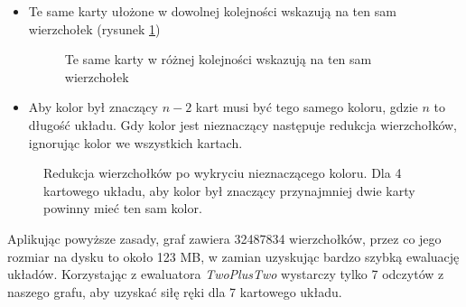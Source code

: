 \begin{itemize}
    \item Te same karty ułożone w dowolnej kolejności wskazują na ten sam wierzchołek (rysunek \ref{fig:graph-2})
    
    \begin{figure}[h]
    \centering
    \caption{Te same karty w różnej kolejności wskazują na ten sam wierzchołek}
    \label{fig:graph-2}   
    \end{figure}
    
    \item Aby kolor był znaczący $n-2$ kart musi być tego samego koloru, gdzie $n$ to długość układu. Gdy kolor jest nieznaczący następuje redukcja wierzchołków, ignorując kolor we wszystkich kartach.
\end{itemize}

\begin{figure}[h]
\centering
{}
\caption{Redukcja wierzchołków po wykryciu nieznaczącego koloru. Dla 4 kartowego układu, aby kolor był znaczący przynajmniej dwie karty powinny mieć ten sam kolor.}
\label{fig:graph-3}
\end{figure}

Aplikując powyższe zasady, graf zawiera 32487834 wierzchołków, przez co jego rozmiar na dysku to około 123 MB, w zamian uzyskując bardzo szybką ewaluację układów.
Korzystając z ewaluatora \emph{TwoPlusTwo} wystarczy tylko 7 odczytów z naszego grafu, aby uzyskać siłę ręki dla 7 kartowego układu. 

